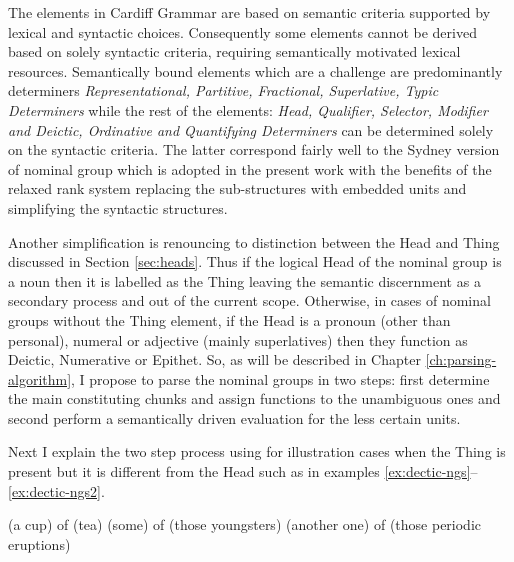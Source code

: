 The elements in Cardiff Grammar are based on semantic criteria supported by lexical and syntactic choices. Consequently some elements cannot be derived based on solely syntactic criteria, requiring semantically motivated lexical resources. Semantically bound elements which are a challenge are predominantly determiners \textit{Representational, Partitive, Fractional, Superlative, Typic Determiners} while the rest of the elements: \textit{Head, Qualifier, Selector, Modifier and Deictic, Ordinative and Quantifying Determiners} can be determined solely on the syntactic criteria. The latter correspond fairly well to the Sydney version of nominal group which is adopted in the present work with the benefits of the relaxed rank system replacing the sub-structures with embedded units and simplifying the syntactic structures. 
	
	
Another simplification is renouncing to distinction between the Head and Thing \citep[390--396]{Halliday2013} discussed in Section \ref{sec:heads}. Thus if the logical Head of the nominal group is a noun then it is labelled as the Thing leaving the semantic discernment as a secondary process and out of the current scope. Otherwise, in cases of nominal groups without the Thing element, if the Head is a pronoun (other than personal), numeral or adjective (mainly superlatives) then they function as Deictic, Numerative or Epithet. So, as will be described in Chapter \ref{ch:parsing-algorithm}, I propose to parse the nominal groups in two steps: first determine the main constituting chunks and assign functions to the unambiguous ones and second perform a semantically driven evaluation for the less certain units. 
	
Next I explain the two step process using for illustration cases when the Thing is present but it is different from the Head such as in examples \ref{ex:dectic-ngs}--\ref{ex:dectic-ngs2}. 
\begin{exe}
    \ex \label{ex:dectic-ngs} (a cup) of (tea)
    \ex \label{ex:dectic-ngs1}(some) of (those youngsters)
    \ex \label{ex:dectic-ngs2}(another one) of (those periodic eruptions)
\end{exe}

